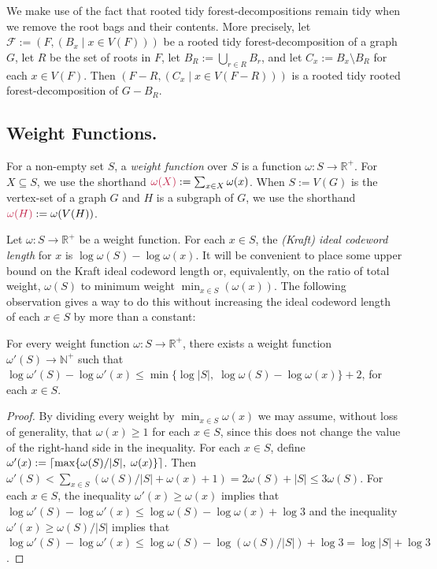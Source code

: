 \documentclass[twoside,leqno]{article}
\makeatletter
\newcommand{\R}{\mathbb{R}}
\newcommand{\N}{\mathbb{N}}
\renewcommand{\ge}{\geqslant}
\renewcommand{\le}{\leqslant}
\newcommand{\defin}[1]{\emph{\textcolor{brightmaroon}{#1}}}
\def\mathcolor#1#{\@mathcolor{#1}}
\def\@mathcolor#1#2#3{%
  \protect\leavevmode
  \begingroup
    \color#1{#2}#3%
  \endgroup
}
\newcommand{\mathdefin}[1]{\mathcolor{brightmaroon}{#1}}
\DeclarePairedDelimiter{\ceil}{\lceil}{\rceil}
\makeatother
\begin{document}
We make use of the fact that rooted tidy forest-decompositions remain tidy when we remove the root bags and their contents.  More precisely, let $\mathcal{F}:=(F,(B_x\mid x\in V(F)))$ be a rooted tidy forest-decomposition of a graph $G$, let $R$ be the set of roots in $F$, let $B_R:=\bigcup_{r\in R}B_r$, and let $C_x:=B_x\setminus B_R$ for each $x\in V(F)$.  Then $(F-R,(C_x\mid x\in V(F-R)))$ is a rooted tidy rooted forest-decomposition of $G-B_R$.

\subsection{Weight Functions.}

For a non-empty set $S$, a \defin{weight function} over $S$ is a function $\omega:S\to\R^+$. For $X\subseteq S$, we use the shorthand $\mathdefin{\omega(X)}:=\sum_{x\in X}\omega(x)$.  When $S:=V(G)$ is the vertex-set of a graph $G$ and $H$ is a subgraph of $G$, we use the shorthand $\mathdefin{\omega(H)}:=\omega(V(H))$.

Let $\omega:S\to\R^+$ be a weight function.  For each $x\in S$, the \defin{(Kraft) ideal codeword length} for $x$ is $\log\omega(S)-\log\omega(x)$.
It will be convenient to place some upper bound on the Kraft ideal codeword length or, equivalently, on the ratio of total weight, $\omega(S)$ to minimum weight $\min_{x\in S}(\omega(x))$.  The following observation gives a way to do this without increasing the ideal codeword length of each $x\in S$ by more than a constant:

\begin{obs}\label{obs:nice}
  For every weight function $\omega:S\to\R^+$, there exists a weight function $\omega'(S)\to\N^+$ such that $\log\omega'(S)-\log\omega'(x)\le\min\{\log|S|,\;\log\omega(S)-\log\omega(x)\}+2$, for each $x\in S$.
\end{obs}

\begin{proof}
  By dividing every weight by $\min_{x\in S}\omega(x)$ we may assume, without loss of generality, that $\omega(x)\ge 1$ for each $x\in S$, since this does not change the value of the right-hand side in the inequality.
  For each $x\in S$, define $\omega'(x):=\ceil{\max\{\omega(S)/|S|,\; \omega(x)\}}$.  Then $\omega'(S)<\sum_{x\in S}(\omega(S)/|S|+\omega(x)+1)= 2\omega(S)+|S|\le 3\omega(S)$.  For each $x\in S$, the inequality $\omega'(x)\ge \omega(x)$ implies that $\log\omega'(S)-\log\omega'(x)\le\log \omega(S)-\log\omega(x)+\log 3$ and the inequality $\omega'(x)\ge \omega(S)/|S|$ implies that $\log\omega'(S)-\log\omega'(x)\le \log\omega(S)-\log(\omega(S)/|S|) + \log 3 = \log|S| + \log 3$.
\end{proof}
\end{document}
